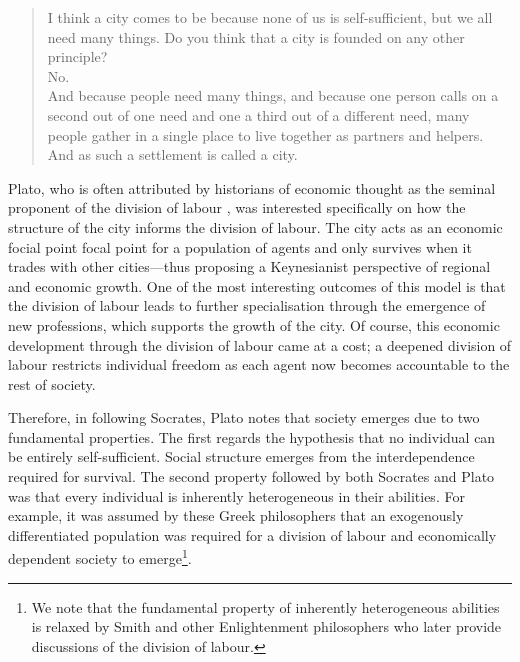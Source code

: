\begin{quote}
I think a city comes to be because none of us is self-sufficient, but we all need many things. Do you think that a city is founded on any other principle?
\\
No.
\\
And because people need many things, and because one person calls on a second out of one need and one a third out of a different need, many people gather in a single place to live together as partners and helpers. And as such a settlement is called a city.

\begin{flushright}
\citet[p.~151]{Plato2007}
\end{flushright}
\end{quote}

Plato, who is often attributed by historians of economic thought as the seminal proponent of the division of labour \citep{Silvermintz2010}, was interested specifically on how the structure of the city informs the division of labour. The city acts as an economic focial point focal point for a population of agents and only survives when it trades with other cities---thus proposing a Keynesianist perspective of regional and economic growth. One of the most interesting outcomes of this model is that the division of labour leads to further specialisation through the emergence of new professions, which supports the growth of the city. Of course, this economic development through the division of labour came at a cost; a deepened division of labour restricts individual freedom as each agent now becomes accountable to the rest of society.

Therefore, in following Socrates, Plato notes that society emerges due to two fundamental properties. The first regards the hypothesis that no individual can be entirely self-sufficient. Social structure emerges from the interdependence required for survival. The second property followed by both Socrates and Plato was that every individual is inherently heterogeneous in their abilities. For example, it was assumed by these Greek philosophers that an exogenously differentiated population was required for a division of labour and economically dependent society to emerge\footnote{We note that the fundamental property of inherently heterogeneous abilities is relaxed by Smith and other Enlightenment philosophers who later provide discussions of the division of labour.}.

